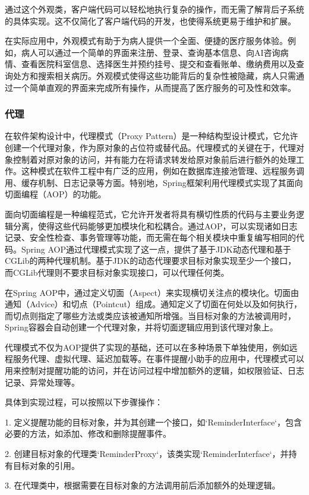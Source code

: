 通过这个外观类，客户端代码可以轻松地执行复杂的操作，而无需了解背后子系统的具体实现。这不仅简化了客户端代码的开发，也使得系统更易于维护和扩展。

在实际应用中，外观模式有助于为病人提供一个全面、便捷的医疗服务体验。例如，病人可以通过一个简单的界面来注册、登录、查询基本信息、向AI咨询病情、查看医院科室信息、选择医生并预约挂号、提交和查看账单、缴纳费用以及查询处方和搜索相关病历。外观模式使得这些功能背后的复杂性被隐藏，病人只需通过一个简单直观的界面来完成所有操作，从而提高了医疗服务的可及性和效率。

\subsubsection{代理}
在软件架构设计中，代理模式（Proxy Pattern）是一种结构型设计模式，它允许创建一个代理对象，作为原对象的占位符或替代品。代理模式的关键在于，代理对象控制着对原对象的访问，并有能力在将请求转发给原对象前后进行额外的处理工作。这种模式在软件工程中有广泛的应用，例如在数据库连接池管理、远程服务调用、缓存机制、日志记录等方面。特别地，Spring框架利用代理模式实现了其面向切面编程（AOP）的功能。

面向切面编程是一种编程范式，它允许开发者将具有横切性质的代码与主要业务逻辑分离，使得这些代码能够更加模块化和松耦合。通过AOP，可以实现诸如日志记录、安全性检查、事务管理等功能，而无需在每个相关模块中重复编写相同的代码。Spring AOP通过代理模式实现了这一点，提供了基于JDK动态代理和基于CGLib的两种代理机制。基于JDK的动态代理要求目标对象实现至少一个接口，而CGLib代理则不要求目标对象实现接口，可以代理任何类。

在Spring AOP中，通过定义切面（Aspect）来实现横切关注点的模块化。切面由通知（Advice）和切点（Pointcut）组成。通知定义了切面在何处以及如何执行，而切点则指定了哪些方法或类应该被通知所增强。当目标对象的方法被调用时，Spring容器会自动创建一个代理对象，并将切面逻辑应用到该代理对象上。

代理模式不仅为AOP提供了实现的基础，还可以在多种场景下单独使用，例如远程服务代理、虚拟代理、延迟加载等。在事件提醒小助手的应用中，代理模式可以用来控制对提醒功能的访问，并在访问过程中增加额外的逻辑，如权限验证、日志记录、异常处理等。

具体到实现过程，可以按照以下步骤操作：

1. 定义提醒功能的目标对象，并为其创建一个接口，如`ReminderInterface`，包含必要的方法，如添加、修改和删除提醒事件。

2. 创建目标对象的代理类`ReminderProxy`，该类实现`ReminderInterface`，并持有目标对象的引用。

3. 在代理类中，根据需要在目标对象的方法调用前后添加额外的处理逻辑。

